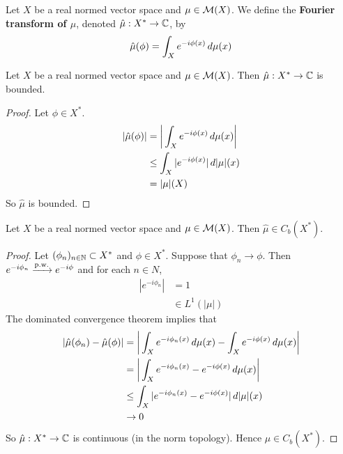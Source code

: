 \documentclass{book}
\begin{document}
	\begin{defn}
		Let $X$ be a real normed vector space and $\mu \in \mathcal{M}(X)$. We define the \textbf{Fourier transform of $\mu$}, denoted $\hat{\mu}: X^* \rightarrow \mathbb{C}$, by
		$$\hat{\mu}(\phi) = \int_X e^{-i\phi(x)} \, d \mu(x)$$ 
	\end{defn}
	
	\begin{ex}
		Let $X$ be a real normed vector space and $\mu \in \mathcal{M}(X)$. Then $\hat{\mu} : X^* \rightarrow \mathbb{C}$ is bounded.
	\end{ex}
	
	\begin{proof}
		Let $\phi \in X^*$. 
		\begin{align*}
			|\hat{\mu}(\phi)|
			& = \bigg | \int_X e^{-i \phi(x)} \, d \mu(x) \bigg| \\
			& \leq \int_X |e^{-i \phi(x)}| \, d|\mu|(x) \\
			& = |\mu|(X) \\
		\end{align*}
		So $\hat{\mu}$ is bounded.
	\end{proof}
	
	\begin{ex}
		Let $X$ be a real normed vector space and $\mu \in \mathcal{M}(X)$. Then $\hat{\mu} \in C_b(X^*)$.
	\end{ex}
	
	\begin{proof}
		Let $(\phi_{n})_{n \in \mathbb{N}} \subset X^*$ and $\phi \in X^*$. Suppose that $\phi_n \rightarrow \phi$. Then $e^{-i \phi_n} \xrightarrow{\text{p.w.}} e^{-i\phi}$ and for each $n \in N$, 
		\begin{align*}
			|e^{-i \phi_n}| 
			& = 1 \\
			& \in L^1(|\mu|)
		\end{align*}
		The dominated convergence theorem implies that
		\begin{align*}
			|\hat{\mu}(\phi_n) - \hat{\mu}(\phi)| 
			& = \bigg| \int_X e^{-i \phi_n(x)} \, d \mu(x) - \int_X e^{-i \phi(x)} \, d \mu(x)\bigg| \\
			& =  \bigg| \int_X e^{-i \phi_n(x)} - e^{-i \phi(x)} \, d \mu(x) \bigg| \\
			& \leq \int_X |e^{-i \phi_n(x)} - e^{-i \phi(x)}| \, d|\mu|(x) \\
			& \rightarrow 0
		\end{align*}
		So $\hat{\mu}: X^* \rightarrow \mathbb{C}$ is continuous (in the norm topology). Hence $\hat{\mu} \in C_b(X^*)$.
	\end{proof}
	
\end{document}
